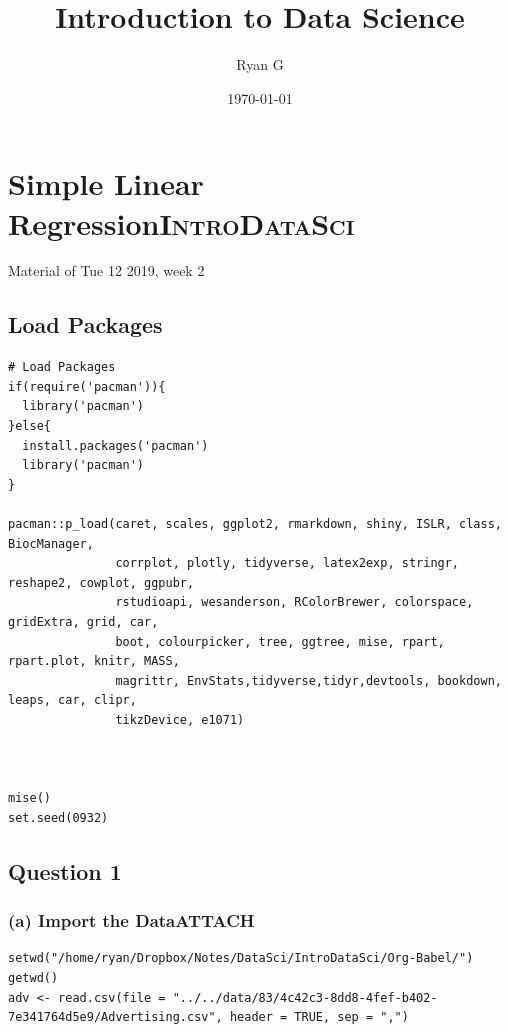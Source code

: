 \documentclass[11pt]{article}
\author{Ryan G}
\date{\today}
\title{Introduction to Data Science}
\begin{document}
\maketitle
\tableofcontents

\section{Simple Linear Regression\hfill{}\textsc{IntroDataSci}}
\label{sec:orgad9bff5}
Material of Tue 12 2019, week 2
\subsection{Load Packages}
\label{sec:orge805c55}
\begin{verbatim}
# Load Packages
if(require('pacman')){
  library('pacman')
}else{
  install.packages('pacman')
  library('pacman')
}

pacman::p_load(caret, scales, ggplot2, rmarkdown, shiny, ISLR, class, BiocManager,
               corrplot, plotly, tidyverse, latex2exp, stringr, reshape2, cowplot, ggpubr,
               rstudioapi, wesanderson, RColorBrewer, colorspace, gridExtra, grid, car,
               boot, colourpicker, tree, ggtree, mise, rpart, rpart.plot, knitr, MASS,
               magrittr, EnvStats,tidyverse,tidyr,devtools, bookdown, leaps, car, clipr,
               tikzDevice, e1071)



mise()
set.seed(0932)
\end{verbatim}

\subsection{Question 1}
\label{sec:org058c0ed}
\subsubsection{(a) Import the Data\hfill{}\textsc{ATTACH}}
\label{sec:org7a71359}
\begin{verbatim}
setwd("/home/ryan/Dropbox/Notes/DataSci/IntroDataSci/Org-Babel/")
getwd()
adv <- read.csv(file = "../../data/83/4c42c3-8dd8-4fef-b402-7e341764d5e9/Advertising.csv", header = TRUE, sep = ",")
\end{verbatim}
\end{document}
